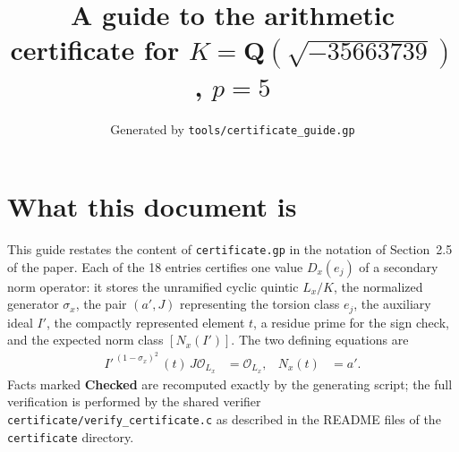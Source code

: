 \documentclass[11pt]{article}
\title{A guide to the arithmetic certificate for $K=\mathbf Q(\sqrt{-35663739})$, $p=5$}
\author{}
\date{Generated by \texttt{tools/certificate\_guide.gp}}
\begin{document}
\maketitle
\section*{What this document is}
This guide restates the content of \texttt{certificate.gp} in the
notation of Section~2.5 of the paper.  Each of the 18 entries
certifies one value $D_x(e_j)$ of a secondary norm operator: it
stores the unramified cyclic quintic $L_x/K$, the normalized
generator $\sigma_x$, the pair $(a',J)$ representing the torsion
class $e_j$, the auxiliary ideal $I'$, the compactly represented
element $t$, a residue prime for the sign check, and the expected
norm class $[N_x(I')]$.  The two defining equations are
\begin{align*}
I'^{\,(1-\sigma_x)^2}\,(t)\,J\mathcal O_{L_x}&=\mathcal O_{L_x},&
N_x(t)&=a'.
\end{align*}
Facts marked \textbf{Checked} are recomputed exactly by the
generating script; the full verification is performed by the
shared verifier \texttt{certificate/verify\_certificate.c} as
described in the README files of the \texttt{certificate}
directory.
\end{document}
